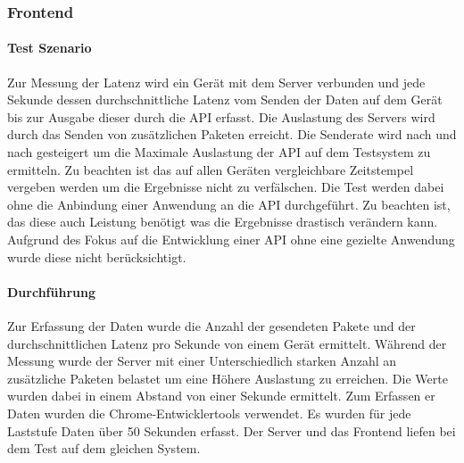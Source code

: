 \documentclass[a4paper]{spie}  %
\begin{document}
\subsubsection{Frontend}

\paragraph{Test Szenario} Zur Messung der Latenz wird ein Gerät mit dem Server verbunden und jede Sekunde dessen durchschnittliche Latenz vom Senden der Daten auf dem Gerät bis zur Ausgabe dieser durch die API erfasst. Die Auslastung des Servers wird durch das Senden von zusätzlichen Paketen erreicht. Die Senderate wird nach und nach gesteigert um die Maximale Auslastung der API auf dem Testsystem zu ermitteln. Zu beachten ist das auf allen Geräten vergleichbare Zeitstempel vergeben werden um die Ergebnisse nicht zu verfälschen. Die Test werden dabei ohne die Anbindung einer Anwendung an die API durchgeführt. Zu beachten ist, das diese auch Leistung benötigt was die Ergebnisse drastisch verändern kann. Aufgrund des Fokus auf die Entwicklung einer API ohne eine gezielte Anwendung wurde diese nicht berücksichtigt.


\paragraph{Durchführung}
Zur Erfassung der Daten wurde die Anzahl der gesendeten Pakete und der durchschnittlichen Latenz pro Sekunde von einem Gerät ermittelt. Während der Messung wurde der Server mit einer Unterschiedlich starken Anzahl an zusätzliche Paketen belastet um eine Höhere Auslastung zu erreichen. Die Werte wurden dabei in einem Abstand von einer Sekunde ermittelt. Zum Erfassen er Daten wurden die Chrome-Entwicklertools verwendet. Es wurden für jede Laststufe Daten über 50 Sekunden erfasst. Der Server und das Frontend liefen bei dem Test auf dem gleichen System.
\end{document}
